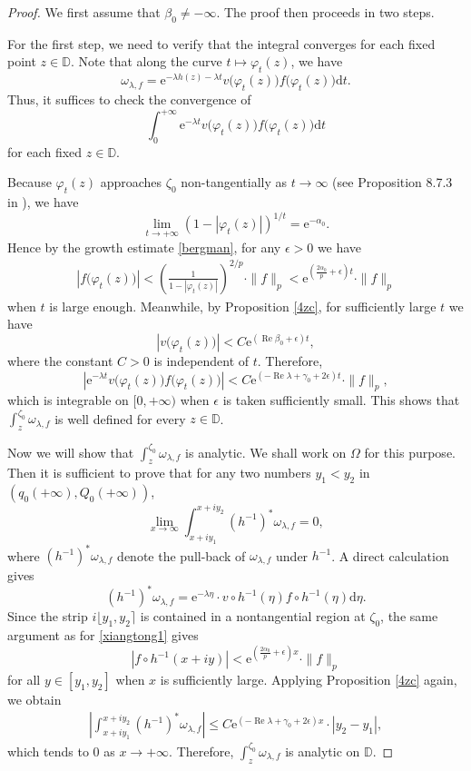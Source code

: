\documentclass{amsart}
\theoremstyle{proclaim}
\theoremstyle{fancyproclaim}
\theoremstyle{definition}
\theoremstyle{fancystatement}
\numberwithin{equation}{section}
\begin{document}
\begin{proof}
We first assume that $\beta_0\ne-\infty$. The proof then proceeds in two steps.

For the first step, we need to verify that the integral converges for each fixed point $z\in \mathbb{D}$. Note that along the curve $t\mapsto\varphi_t(z)$, we have
$$\omega_{\lambda,f}= \mathrm{e}^{-\lambda h(z) - \lambda t}v\bigl(\varphi_t(z)\bigr) f\bigl(\varphi_t(z)\bigr) \mathrm{d}t.$$
Thus, it suffices to check the convergence of
$$\int_0^{+\infty} \mathrm{e}^{-\lambda t}v\bigl(\varphi_t(z)\bigr) f\bigl( \varphi_t(z)\bigr) \mathrm{d}t$$ 
for each fixed $z\in\mathbb{D}$. 

Because $\varphi_t(z)$ approaches $\zeta_0$ non-tangentially as $t\to\infty$ (see Proposition 8.7.3 in \cite{cs}), we have
$$\lim_{t\to +\infty}(1-|\varphi_t(z)|)^{1/t}= \mathrm{e}^{-\alpha_0}.$$ 
Hence by the growth estimate \eqref{bergman}, for any $\epsilon>0$ we have
\begin{align}\label{xiangtong1}
|f\bigl(\varphi_t(z)\bigr)|<\left(\frac{1}{1-|\varphi_t(z)|}\right)^{2/p}\cdot\|f\|_p< \mathrm{e}^{\left(\frac{2\alpha_0}{p}+\epsilon\right)t}\cdot\|f\|_p
\end{align}
when $t$ is large enough. Meanwhile, by Proposition \ref{4zc}, for sufficiently large $t$ we have
$$|v\bigl(\varphi_t(z)\bigr)|<C \mathrm{e}^{( \operatorname{Re}\beta_0+\epsilon)t},$$
where the constant $C>0$ is independent of $t$. Therefore, 
$$|\mathrm{e}^{-\lambda t}v\bigl(\varphi_t(z)\bigr) f\bigl( \varphi_t(z)\bigr)|<C \mathrm{e}^{(-\operatorname{Re}\lambda+\gamma_0+2\epsilon)t}\cdot\|f\|_p,$$
which is integrable on $[0,+\infty)$ when $\epsilon$ is  taken sufficiently small. This shows that $\int_z^{\zeta_0}\omega_{\lambda,f}$ is well defined for every $z\in\mathbb{D}$.

Now we will show that $\int_z^{\zeta_0}\omega_{\lambda,f}$ is analytic.  We shall work on $\Omega$ for this purpose. Then it  is sufficient to prove that for any two numbers $y_1<y_2$ in $(q_0(+\infty), Q_0(+\infty))$,
$$\lim_{x\to\infty}\int_{x+iy_1}^{x+iy_2}(h^{-1})^*\omega_{\lambda,f}=0,$$
where $(h^{-1})^*\omega_{\lambda,f}$ denote the pull-back of $\omega_{\lambda,f}$ under $h^{-1}$. A direct calculation gives
$$(h^{-1})^*\omega_{\lambda,f}= \mathrm{e}^{-\lambda\eta}\cdot v\circ h^{-1}(\eta)f\circ h^{-1}(\eta) \mathrm{d}\eta.$$
Since the strip $i\lfloor y_1, y_2\rceil$ is contained in a nontangential region at $\zeta_0$, the same argument as for \eqref{xiangtong1} gives
$$|f\circ h^{-1}(x+iy)|<\mathrm{e}^{\left(\frac{2\alpha_0}{p}+\epsilon\right)x}\cdot\|f\|_p$$
for all $y\in[y_1, y_2]$ when $x$ is sufficiently large. Applying Proposition \ref{4zc} again, we obtain
\begin{align*}
\left|\int_{x+iy_1}^{x+iy_2} (h^{-1})^*\omega_{\lambda,f}\right|\leq C  \mathrm{e}^{(-\operatorname{Re}\lambda+\gamma_0+2\epsilon)x}\cdot|y_2-y_1|,
\end{align*}
which tends to $0$ as $x\to+\infty$. Therefore, $\int_z^{\zeta_0}\omega_{\lambda,f}$ is analytic on $\mathbb{D}$.


\end{proof}
\end{document}
